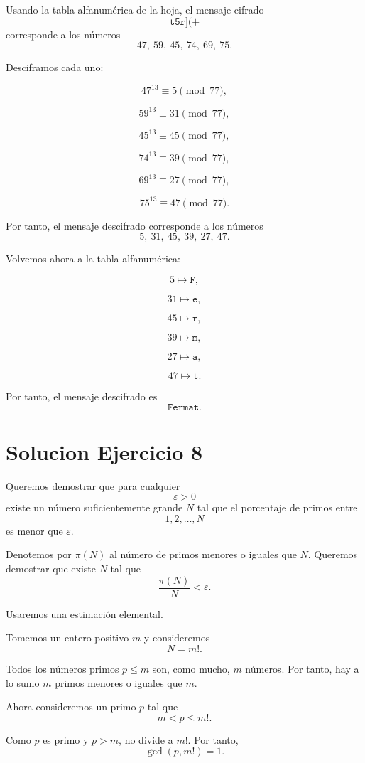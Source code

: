 \documentclass[12pt]{article}
\begin{document}
Usando la tabla alfanumérica de la hoja, el mensaje cifrado
\[
\texttt{t5r](+}
\]
corresponde a los números
\[
47,\ 59,\ 45,\ 74,\ 69,\ 75.
\]

Desciframos cada uno:

\[
47^{13}\equiv 5\pmod{77},
\]

\[
59^{13}\equiv 31\pmod{77},
\]

\[
45^{13}\equiv 45\pmod{77},
\]

\[
74^{13}\equiv 39\pmod{77},
\]

\[
69^{13}\equiv 27\pmod{77},
\]

\[
75^{13}\equiv 47\pmod{77}.
\]

Por tanto, el mensaje descifrado corresponde a los números
\[
5,\ 31,\ 45,\ 39,\ 27,\ 47.
\]

Volvemos ahora a la tabla alfanumérica:

\[
5\mapsto \texttt{F},
\]

\[
31\mapsto \texttt{e},
\]

\[
45\mapsto \texttt{r},
\]

\[
39\mapsto \texttt{m},
\]

\[
27\mapsto \texttt{a},
\]

\[
47\mapsto \texttt{t}.
\]

Por tanto, el mensaje descifrado es
\[
\boxed{\texttt{Fermat}}.
\]

\section*{Solucion Ejercicio 8}

Queremos demostrar que para cualquier
\[
\varepsilon>0
\]
existe un número suficientemente grande \(N\) tal que el porcentaje de primos entre
\[
1,2,\dots,N
\]
es menor que \(\varepsilon\).

Denotemos por \(\pi(N)\) al número de primos menores o iguales que \(N\). Queremos demostrar que existe \(N\) tal que
\[
\frac{\pi(N)}{N}<\varepsilon.
\]

Usaremos una estimación elemental.

Tomemos un entero positivo \(m\) y consideremos
\[
N=m!.
\]

Todos los números primos \(p\leq m\) son, como mucho, \(m\) números. Por tanto, hay a lo sumo \(m\) primos menores o iguales que \(m\).

Ahora consideremos un primo \(p\) tal que
\[
m<p\leq m!.
\]

Como \(p\) es primo y \(p>m\), no divide a \(m!\). Por tanto,
\[
\gcd(p,m!)=1.
\]
\end{document}
